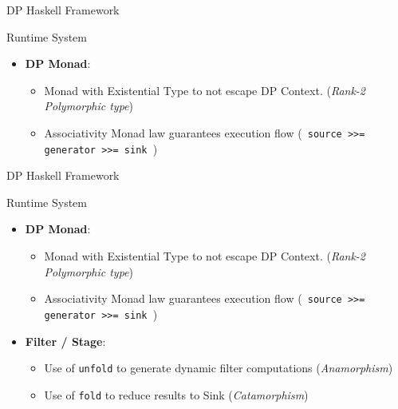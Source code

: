 \documentclass{beamer}
\begin{document}
  \begin{frame}[fragile]{DP Haskell Framework}
    \begin{block}{Runtime System}
      \begin{itemize}
        \item \textbf{DP Monad}:
        \begin{itemize} 
        \item Monad with Existential Type to not escape DP Context. (\textit{Rank-2 Polymorphic type})
        \item Associativity Monad law guarantees execution flow (\texttt{ source >>= generator >>= sink }) 
        \end{itemize}
      \end{itemize}
    \end{block}
    \end{frame}
  
  \begin{frame}[fragile]{DP Haskell Framework}
    \begin{block}{Runtime System}
      \begin{itemize}
        \item \textbf{DP Monad}:
        \begin{itemize} 
        \item Monad with Existential Type to not escape DP Context. (\textit{Rank-2 Polymorphic type})
        \item Associativity Monad law guarantees execution flow (\texttt{ source >>= generator >>= sink }) 
        \end{itemize}
        \item \textbf{Filter / Stage}: 
        \begin{itemize}
          \item Use of \texttt{unfold} to generate dynamic filter computations (\textit{Anamorphism})
          \item Use of \texttt{fold} to reduce results to Sink (\textit{Catamorphism})
        \end{itemize}
      \end{itemize}
    \end{block}
    \end{frame}
  
\end{document}
